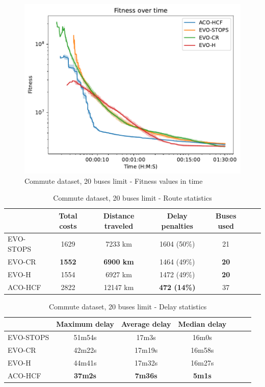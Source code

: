 \clearpage

\begin{figure}
    \centering
    \includegraphics[width=1\linewidth]
    {img/exp_commute_100_20_time.pdf}
    \caption{Commute dataset, 20 buses limit - Fitness values in time}
    \label{fig:exp_commute_20}
\end{figure}

\begin{table}
    \centering
    \begin{tabular}{lcccccc}
         & Total costs & Distance traveled & Delay penalties & Buses used \\
         \hline
         EVO-STOPS & 1629 & 7233 km & 1604 (50\%) & 21 \\
         EVO-CR & \textbf{1552} & \textbf{6900 km} & 1464 (49\%) & \textbf{20} \\
         EVO-H & 1554 & 6927 km & 1472 (49\%) & \textbf{20} \\
         ACO-HCF & 2822 & 12147 km & \textbf{472 (14\%)} & 37 \\
    \end{tabular}
    \caption{Commute dataset, 20 buses limit - Route statistics}
    \label{tab:exp_commute_20_route_stats}
\end{table}

\begin{table}
    \centering
    \begin{tabular}{lcccccc}
         &  Maximum delay & Average delay & Median delay \\
         \hline
         EVO-STOPS & 51m54s & 17m3s & 16m0s \\
         EVO-CR & 42m22s & 17m19s & 16m58s \\
         EVO-H & 44m41s & 17m32s & 16m27s \\
         ACO-HCF & \textbf{37m2s} & \textbf{7m36s} & \textbf{5m1s} \\
    \end{tabular}
    \caption{Commute dataset, 20 buses limit - Delay statistics}
    \label{tab:exp_commute_20_delay_stats}
\end{table}

